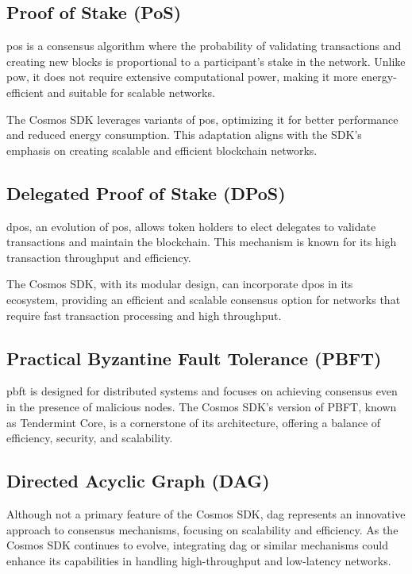 \subsection{Proof of Stake (PoS)}

\gls{pos} is a consensus algorithm where the probability of validating transactions and creating new blocks is proportional to a participant's stake in the network. Unlike \gls{pow}, it does not require extensive computational power, making it more energy-efficient and suitable for scalable networks.

The Cosmos SDK leverages variants of \gls{pos}, optimizing it for better performance and reduced energy consumption. This adaptation aligns with the SDK's emphasis on creating scalable and efficient blockchain networks.

\subsection{Delegated Proof of Stake (DPoS)}

\gls{dpos}, an evolution of \gls{pos}, allows token holders to elect delegates to validate transactions and maintain the blockchain. This mechanism is known for its high transaction throughput and efficiency.

The Cosmos SDK, with its modular design, can incorporate \gls{dpos} in its ecosystem, providing an efficient and scalable consensus option for networks that require fast transaction processing and high throughput.

\subsection{Practical Byzantine Fault Tolerance (PBFT)}

\gls{pbft} is designed for distributed systems and focuses on achieving consensus even in the presence of malicious nodes. The Cosmos SDK's version of PBFT, known as Tendermint Core, is a cornerstone of its architecture, offering a balance of efficiency, security, and scalability.

\subsection{Directed Acyclic Graph (DAG)}

Although not a primary feature of the Cosmos SDK, \gls{dag} represents an innovative approach to consensus mechanisms, focusing on scalability and efficiency. As the Cosmos SDK continues to evolve, integrating \gls{dag} or similar mechanisms could enhance its capabilities in handling high-throughput and low-latency networks.

